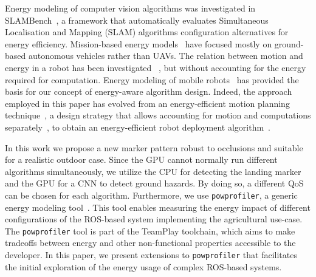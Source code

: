 \documentclass[conference]{IEEEtran}
\newcommand{\stt}[1]{{\small\tt #1}} %
\newcommand{\powprof}{\stt{powprofiler}}
\begin{document}
Energy modeling of computer vision algorithms was investigated in
SLAMBench~\cite{nardi2015introducing}, a framework that automatically evaluates
Simultaneous Localisation and Mapping (SLAM) algorithms configuration alternatives
for energy efficiency. 
%
Mission-based energy
models~\cite{sadrpour2013experimental} have 
focused mostly on ground-based autonomous vehicles rather than UAVs. 
The relation between motion and energy in a
robot has been investigated ~\cite{morales2009power}, but without accounting for the energy required for computation.
%
Energy modeling of mobile robots~\cite{mei2006deployment} has provided
the basis for our concept of %
energy-aware algorithm design. Indeed, the approach employed in this paper has evolved
from an energy-efficient motion planning technique~\cite{mei2004energy}, a design strategy that allows accounting for
motion and computations separately~\cite{mei2005case}, to obtain an
energy-efficient robot deployment algorithm~\cite{mei2006deployment}.
%
%

In this work we propose a new marker pattern robust to occlusions and suitable for a realistic outdoor case. Since the GPU cannot normally run different algorithms simultaneously, we utilize the CPU for detecting the landing marker and the GPU for a CNN to detect ground hazards. By doing so, a different QoS can be chosen for each algorithm. Furthermore, we use \powprof{}, a generic energy
modeling tool~\cite{seewald2019coarse}. This tool enables measuring
the energy impact of different configurations of the ROS-based system
implementing the agricultural use-case.
The \powprof{} tool is part of the TeamPlay toolchain, which aims to make tradeoffs between energy and other non-functional properties accessible to the developer. 
In this paper, we present
extensions to \powprof{} that facilitates the initial exploration of
the energy usage of complex ROS-based systems.
\end{document}
